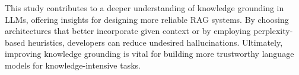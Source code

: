 This study contributes to a deeper understanding of knowledge grounding in LLMs, offering insights for designing more reliable RAG systems. By choosing architectures that better incorporate given context or by employing perplexity-based heuristics, developers can reduce undesired hallucinations. Ultimately, improving knowledge grounding is vital for building more trustworthy language models for knowledge-intensive tasks.

